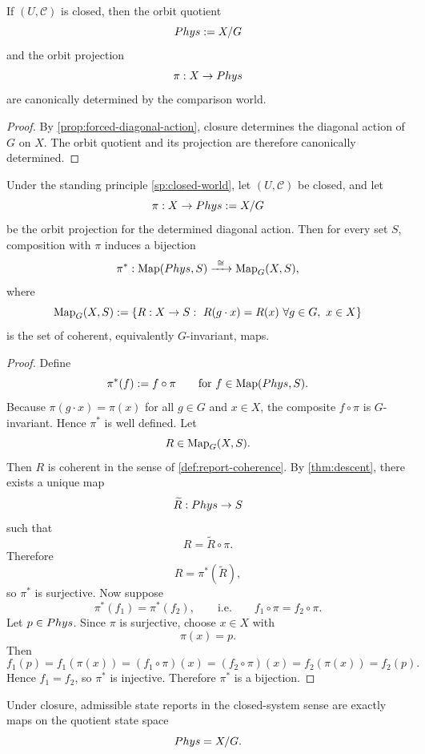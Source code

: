 \begin{corollary}
	\label{cor:closure-terminal-data}
	If \((U,\mathcal C)\) is closed, then the orbit quotient
	\[
		Phys:=X/G
	\]
	and the orbit projection
	\[
		\pi:X\to Phys
	\]
	are canonically determined by the comparison world.
\end{corollary}
\begin{proof}
	By \cref{prop:forced-diagonal-action}, closure determines the diagonal
	action of \(G\) on \(X\). The orbit quotient and its projection are
	therefore canonically determined.
\end{proof}
\begin{proposition}
	\label{prop:principal}
	Under the standing principle \cref{sp:closed-world}, let
	\((U,\mathcal C)\) be closed, and let
	\[
		\pi:X\to Phys:=X/G
	\]
	be the orbit projection for the determined diagonal action. Then for every
	set \(S\), composition with \(\pi\) induces a bijection
	\[
		\pi^*:\Map(\Phys,S)\xrightarrow{\ \cong\ }\Map_G(X,S),
	\]
	where
	\[
		\operatorname{Map}_G(X,S)
		:=
		\{R:X\to S:\ R(g\cdot x)=R(x)\ \forall g\in G,\ x\in X\}
	\]
	is the set of coherent, equivalently \(G\)-invariant, maps.
\end{proposition}
\begin{proof}
	Define
	\[
		\pi^*(f):=f\circ\pi
		\qquad
		\text{for }f\in\operatorname{Map}(Phys,S).
	\]
	Because \(\pi(g\cdot x)=\pi(x)\) for all \(g\in G\) and \(x\in X\), the
	composite \(f\circ\pi\) is \(G\)-invariant. Hence \(\pi^*\) is well
	defined.
	Let
	\[
		R\in\operatorname{Map}_G(X,S).
	\]
	Then \(R\) is coherent in the sense of \cref{def:report-coherence}. By
	\cref{thm:descent}, there exists a unique map
	\[
		\widetilde R:Phys\to S
	\]
	such that
	\[
		R=\widetilde R\circ\pi.
	\]
	Therefore
	\[
		R=\pi^*(\widetilde R),
	\]
	so \(\pi^*\) is surjective.
	Now suppose
	\[
		\pi^*(f_1)=\pi^*(f_2),
		\qquad\text{i.e.}\qquad
		f_1\circ\pi=f_2\circ\pi.
	\]
	Let \(p\in Phys\). Since \(\pi\) is surjective, choose \(x\in X\) with
	\[
		\pi(x)=p.
	\]
	Then
	\[
		f_1(p)
		=
		f_1(\pi(x))
		=
		(f_1\circ\pi)(x)
		=
		(f_2\circ\pi)(x)
		=
		f_2(\pi(x))
		=
		f_2(p).
	\]
	Hence \(f_1=f_2\), so \(\pi^*\) is injective. Therefore \(\pi^*\) is a
	bijection.
\end{proof}
\begin{corollary}
	\label{cor:closed-equals-quotient}
	Under closure, admissible state reports in the closed-system sense are
	exactly maps on the quotient state space
	\[
		Phys=X/G.
	\]
\end{corollary}
